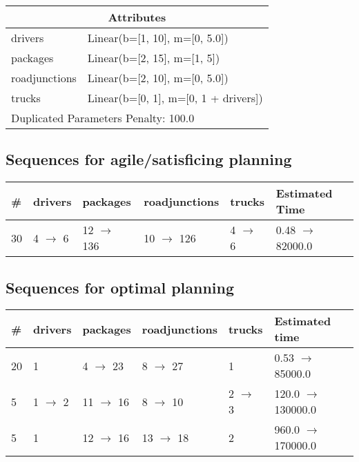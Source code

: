 \documentclass{article}
\begin{document}
                    \begin{center}
                    \begin{tabular}{@{}p{}p{}@{}}
                    \multicolumn{2}{c}{\bf \large Attributes}\\\midrule
                    drivers & Linear(b=[1, 10], m=[0, 5.0])\\
packages & Linear(b=[2, 15], m=[1, 5])\\
roadjunctions & Linear(b=[2, 10], m=[0, 5.0])\\
trucks & Linear(b=[0, 1], m=[0, 1 + drivers])
                    
                     \\\midrule
                    \multicolumn{2}{l}{Duplicated Parameters Penalty: 100.0}
                    \end{tabular}
                    \end{center}
                
                         \subsection*{Sequences for agile/satisficing planning}

                        \begin{center}
                        \begin{tabular}{@{}l|l|l|l|l|l@{}}
                        \# & drivers & packages & roadjunctions & trucks & Estimated Time\\\midrule
                        30&4 $\rightarrow$ 6&12 $\rightarrow$ 136&10 $\rightarrow$ 126&4 $\rightarrow$ 6&0.48 $\rightarrow$ 82000.0
                        \end{tabular}
                        \end{center}
                    
                            \subsection*{Sequences for optimal planning}

                            \begin{center}
                            \begin{tabular}{@{}l|l|l|l|l|l@{}}
                            \# & drivers & packages & roadjunctions & trucks & Estimated time\\\midrule
                            20&1&4 $\rightarrow$ 23&8 $\rightarrow$ 27&1&0.53 $\rightarrow$ 85000.0\\
5&1 $\rightarrow$ 2&11 $\rightarrow$ 16&8 $\rightarrow$ 10&2 $\rightarrow$ 3&120.0 $\rightarrow$ 130000.0\\
5&1&12 $\rightarrow$ 16&13 $\rightarrow$ 18&2&960.0 $\rightarrow$ 170000.0
                            \end{tabular}
                            \end{center}
                    
\end{document}
